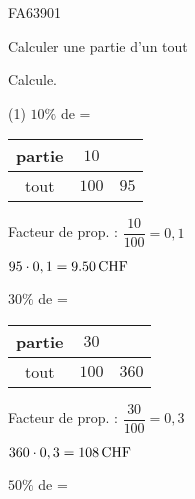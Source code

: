 \documentclass[a4paper,11pt]{report}
\begin{document}
\begin{exof}{FA63}{90}{1} %
\end{exof}


\begin{resolu}{Calculer une partie d'un tout}{
    Calcule.
    \begin{tasks}(1)
    \task $10\%$ de  = \hrulefill %

     \begin{minipage}[]{0.3\textwidth}
     \begin{tabular}{|c|c|c|}
         \hline
         partie & $10$ & \\ \hline
         tout & $100$ & $95$ \\ \hline
     \end{tabular}
     \end{minipage}
     \begin{minipage}[]{0.8\textwidth}
        Facteur de prop. : $\dfrac{10}{100}=0,1$
        
        $95\cdot0,1=\tunit{9,50}{CHF}$
     \end{minipage}

    \task $30\%$ de  = \hrulefill %

    \begin{minipage}[]{0.3\textwidth}
     \begin{tabular}{|c|c|c|}
         \hline
         partie & $30$ & \\ \hline
         tout & $100$ & $360$ \\ \hline
     \end{tabular}
     \end{minipage}
     \begin{minipage}[]{0.7\textwidth}
        Facteur de prop. : $\dfrac{30}{100}=0,3$
        
        $360\cdot0,3=\tunit{108}{CHF}$
     \end{minipage}
     
    \task $50\%$ de  = \hrulefill %


\end{tasks}}
\end{resolu}
\end{document}
